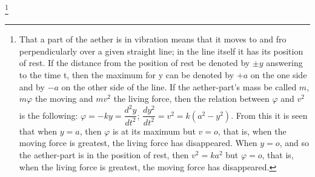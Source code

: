\documentclass[12pt,a4paper]{book}
\renewcommand{\thefootnote}{*)}
\begin{document}
\renewcommand{\thefootnote}{**)}%
\footnote{%
That a part of the aether is in vibration means that it moves to and fro perpendicularly over a given straight line;
in the line itself it has its position of rest. If the distance from the position of rest be denoted by $\pm y$
answering to the time t, then the maximum for y can be denoted by $+a$ on the one side and by $-a$ on the other side of
the line. If the aether-part's mass be called $m$, $m\varphi$ the moving and $mv^{2}$ the living force, then the relation
between $\varphi$ and $v^{2}$ is the following:
$\varphi = -ky = \dfrac{d^{2}y}{dt^{2}}$;
$\dfrac{dy^{2}}{dt^{2}} = v^{2} = k(a^{2}-y^{2})$.
From this it is seen that when $y = a$, then $\varphi$ is at its maximum but $v = o$, that is, when the moving force is
greatest, the living force has disappeared. When $y = o$, and so the aether-part is in the position of rest, then
$v^{2} = ka^{2}$ but $\varphi = o$, that is, when the living force is greatest, the moving force has disappeared.}%
\renewcommand{\thefootnote}{*)}
\end{document}
